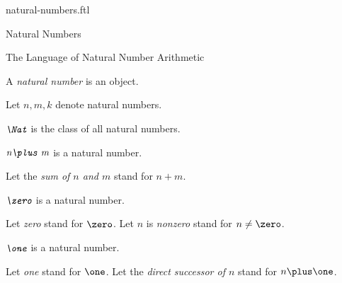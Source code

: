 \documentclass{naproche-library}
\begin{document}
\begin{smodule}{natural-numbers.ftl}



\begin{sfragment}{Natural Numbers}
  \begin{sfragment}{The Language of Natural Number Arithmetic}
    \begin{signature}[forthel,id=NatNumberSig]
      A \emph{natural number} is an object.

      Let $n,m,k$ denote natural numbers.
    \end{signature}

    \begin{definition}[forthel,id=NatDef]
      $\emph{\Nat}$ is the class of all natural numbers.
    \end{definition}

    \begin{signature}[forthel,id=PlusSig]
      $\emph{n\plus m}$ is a natural number.

      Let the \emph{sum of $n$ and $m$} stand for $n\plus m$.
    \end{signature}


    \begin{signature}[forthel,id=ZeroSig]
      $\emph{\zero}$ is a natural number.

      Let \emph{zero} stand for $\zero$.
      Let $n$ is \emph{nonzero} stand for $n\neq\zero$.
    \end{signature}


    \begin{signature}[forthel,id=OneSig]
      $\emph{\one}$ is a natural number.

      Let \emph{one} stand for $\one$.
      Let the \emph{direct successor of $n$} stand for $n\plus\one$.
    \end{signature}



\end{sfragment}
\end{sfragment}
\end{smodule}
\end{document}

